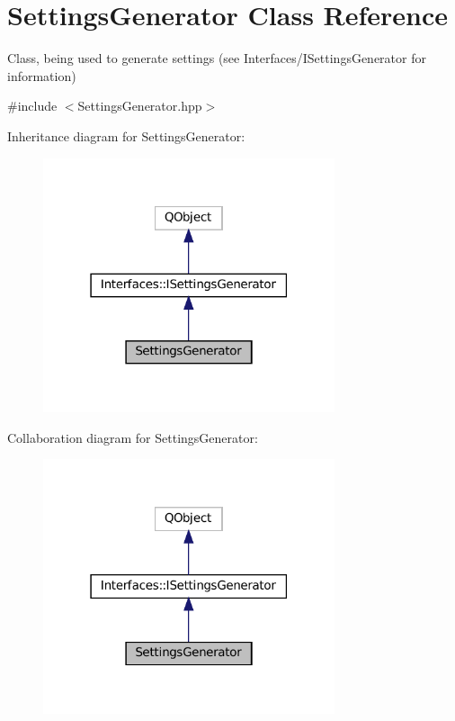 \hypertarget{class_settings_generator}{}\section{Settings\+Generator Class Reference}
\label{class_settings_generator}


Class, being used to generate settings (see Interfaces/\+I\+Settings\+Generator for information)  




{\ttfamily \#include $<$Settings\+Generator.\+hpp$>$}



Inheritance diagram for Settings\+Generator\+:
\nopagebreak
\begin{figure}[H]
\begin{center}
\leavevmode
\includegraphics[width=243pt]{class_settings_generator__inherit__graph}
\end{center}
\end{figure}


Collaboration diagram for Settings\+Generator\+:
\nopagebreak
\begin{figure}[H]
\begin{center}
\leavevmode
\includegraphics[width=243pt]{class_settings_generator__coll__graph}
\end{center}
\end{figure}
